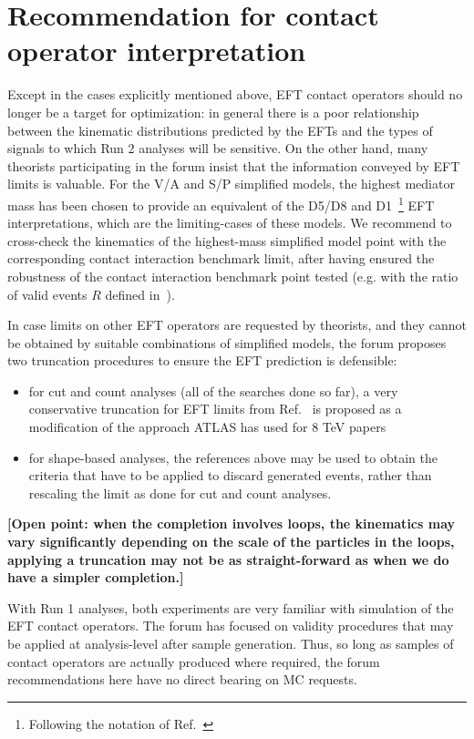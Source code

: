 \documentclass[debug,notitlepage]{dmfm}
\begin{document}
\section{Recommendation for contact operator interpretation}
\label{sec:eft}

Except in the cases explicitly mentioned above, EFT contact operators
should no longer be a target for optimization: in general there is a
poor relationship between the kinematic distributions predicted by the
EFTs and the types of signals to which Run 2 analyses will be
sensitive. On the other hand, many theorists participating in the
forum insist that the information conveyed by EFT limits is
valuable. %
For the V/A and S/P simplified models, the highest mediator mass has
been chosen to provide an equivalent of the D5/D8 and D1~\footnote{Following 
the notation of Ref.~\cite{Goodman:2010ku}} EFT interpretations, 
which are the limiting-cases of these models. 
We recommend to cross-check the kinematics of the highest-mass simplified model point 
with the corresponding contact interaction benchmark limit, after having ensured 
the robustness of the contact interaction benchmark point tested (e.g. with the ratio 
of valid events $R$ defined in~\cite{Aad:2015zva}). 

In case limits on other EFT operators are requested by theorists, and they
cannot be obtained by suitable combinations of simplified models, the
forum proposes two truncation procedures to ensure the EFT prediction
is defensible:

\begin{itemize}
\item for cut and count analyses (all of the searches done so far), a very conservative truncation for EFT 
limits from Ref.~\cite{Racco:2015dxa} is proposed as a modification of the approach 
ATLAS has used for 8 TeV papers~\cite{Aad:2015zva}
\item for shape-based analyses, the references above may be used to obtain the criteria that 
have to be applied to discard generated events, rather than rescaling the limit as done
for cut and count analyses. 
\end{itemize}

\textbf{[Open point: when the completion involves loops, 
the kinematics may vary significantly depending on the scale of the particles in 
the loops, applying a truncation may not be as straight-forward as when we do have a simpler completion.]}

With Run 1 analyses, both experiments are very familiar with
simulation of the EFT contact operators. The forum has focused on
validity procedures that may be applied at analysis-level after sample
generation. Thus, so long as samples of contact operators are actually
produced where required, the forum recommendations here have no direct
bearing on MC requests.





\end{document}
